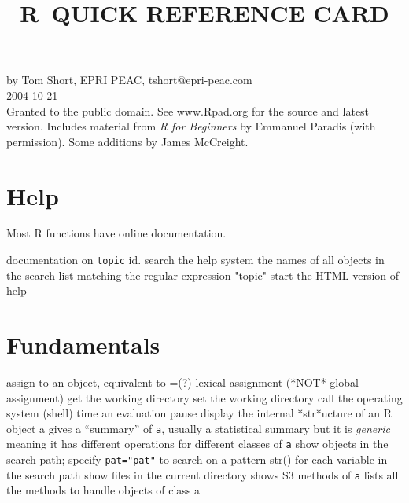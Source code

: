 

\def\content{R}
\def\versionnumber{0.1}  %
\def\year{2014}
\def\month{May}
\def\version{v\versionnumber\ \month\ \year}



\title{\content\ QUICK REFERENCE CARD}

\shortintro

by Tom Short, EPRI PEAC, tshort@epri-peac.com\\2004-10-21\\
Granted to the public domain. See www.Rpad.org for the source and latest version.
Includes material from {\it R for Beginners} by Emmanuel Paradis
(with permission). Some additions by James McCreight.

\section{Help}{Most R functions have online documentation.}

	{documentation on {\tt topic}}
	{id.}
	{search the help system}
	{the names of all objects in the search list
    matching the regular ex\-pres\-sion "to\-pic"}
	{start the HTML version of help}

\section{Fundamentals}{}
\cmdS{<-}	{assign to an object, equivalent to =(?)}
\cmdS{<<-}	{lexical assignment (*NOT* global assignment)}
	{get the working directory}
	{set the working directory}
	{call the operating system (shell)}
	{time an evaluation}
	{pause}
	{display the internal *str*ucture of an R object a}
	{gives a ``summary'' of {\tt a}, usually a statistical summary but it is {\it generic} meaning it has different operations for different classes of {\tt a}}
	{show objects in the search path; specify {\tt pat="pat"} to search on a pattern}
	{str() for each variable in the search path}
	{show files in the current directory}
	{shows S3 methods of {\tt a}}
	{lists all the methods to handle objects of class a}

